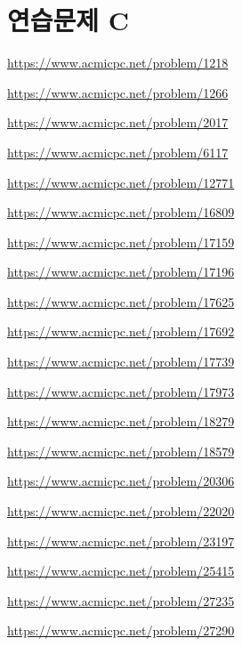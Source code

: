 \section{연습문제 C}
\begin{problem} \url{https://www.acmicpc.net/problem/1218} \end{problem}
\begin{problem} \url{https://www.acmicpc.net/problem/1266} \end{problem}
\begin{problem} \url{https://www.acmicpc.net/problem/2017} \end{problem}
\begin{problem} \url{https://www.acmicpc.net/problem/6117} \end{problem}
\begin{problem} \url{https://www.acmicpc.net/problem/12771} \end{problem}
\begin{problem} \url{https://www.acmicpc.net/problem/16809} \end{problem}
\begin{problem} \url{https://www.acmicpc.net/problem/17159} \end{problem}
\begin{problem} \url{https://www.acmicpc.net/problem/17196} \end{problem}
\begin{problem} \url{https://www.acmicpc.net/problem/17625} \end{problem}
\begin{problem} \url{https://www.acmicpc.net/problem/17692} \end{problem}
\begin{problem} \url{https://www.acmicpc.net/problem/17739} \end{problem}
\begin{problem} \url{https://www.acmicpc.net/problem/17973} \end{problem}
\begin{problem} \url{https://www.acmicpc.net/problem/18279} \end{problem}
\begin{problem} \url{https://www.acmicpc.net/problem/18579} \end{problem}
\begin{problem} \url{https://www.acmicpc.net/problem/20306} \end{problem}
\begin{problem} \url{https://www.acmicpc.net/problem/22020} \end{problem}
\begin{problem} \url{https://www.acmicpc.net/problem/23197} \end{problem}
\begin{problem} \url{https://www.acmicpc.net/problem/25415} \end{problem}
\begin{problem} \url{https://www.acmicpc.net/problem/27235} \end{problem}
\begin{problem} \url{https://www.acmicpc.net/problem/27290} \end{problem}